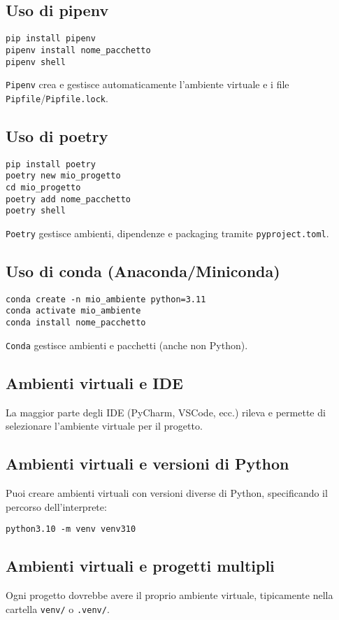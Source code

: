 \documentclass[a4paper,12pt]{article}
\begin{document}
\subsection*{Uso di pipenv}
\begin{lstlisting}
pip install pipenv
pipenv install nome_pacchetto
pipenv shell
\end{lstlisting}
\texttt{Pipenv} crea e gestisce automaticamente l'ambiente virtuale e i file \texttt{Pipfile}/\texttt{Pipfile.lock}.

\subsection*{Uso di poetry}
\begin{lstlisting}
pip install poetry
poetry new mio_progetto
cd mio_progetto
poetry add nome_pacchetto
poetry shell
\end{lstlisting}
\texttt{Poetry} gestisce ambienti, dipendenze e packaging tramite \texttt{pyproject.toml}.

\subsection*{Uso di conda (Anaconda/Miniconda)}
\begin{lstlisting}
conda create -n mio_ambiente python=3.11
conda activate mio_ambiente
conda install nome_pacchetto
\end{lstlisting}
\texttt{Conda} gestisce ambienti e pacchetti (anche non Python).

\subsection*{Ambienti virtuali e IDE}
La maggior parte degli IDE (PyCharm, VSCode, ecc.) rileva e permette di selezionare l'ambiente virtuale per il progetto.

\subsection*{Ambienti virtuali e versioni di Python}
Puoi creare ambienti virtuali con versioni diverse di Python, specificando il percorso dell'interprete:
\begin{lstlisting}
python3.10 -m venv venv310
\end{lstlisting}

\subsection*{Ambienti virtuali e progetti multipli}
Ogni progetto dovrebbe avere il proprio ambiente virtuale, tipicamente nella cartella \texttt{venv/} o \texttt{.venv/}.
\end{document}
